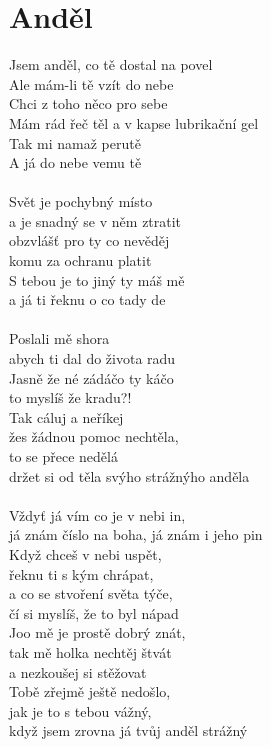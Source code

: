 \section{Anděl}
\begin{multicols}{2}
Jsem anděl, co tě dostal na povel\\
Ale mám-li tě vzít do nebe\\
Chci z toho něco pro sebe\\
Mám rád řeč těl a v kapse lubrikační gel\\
Tak mi namaž perutě\\
A já do nebe vemu tě\\
\\
Svět je pochybný místo\\
a je snadný se v něm ztratit\\
obzvlášť pro ty co nevěděj \\
komu za ochranu platit\\
S tebou je to jiný ty máš mě\\
a já ti řeknu o co tady de\\
\\
Poslali mě shora \\
abych ti dal do života radu\\
Jasně že né zádáčo ty káčo\\
to myslíš že kradu?!\\
Tak cáluj a neříkej \\
žes žádnou pomoc nechtěla,\\
to se přece nedělá\\
držet si od těla svýho strážnýho anděla\\
\\
Vždyť já vím co je v nebi in,\\
já znám číslo na boha, já znám i jeho pin\\
Když chceš v nebi uspět,\\
řeknu ti s kým chrápat, \\
a co se stvoření světa týče,\\
čí si myslíš, že to byl nápad\\
Joo mě je prostě dobrý znát, \\
tak mě holka nechtěj štvát\\
a nezkoušej si stěžovat\\
Tobě zřejmě ještě nedošlo,\\
jak je to s tebou vážný,\\
když jsem zrovna já tvůj anděl strážný\\

\end{multicols}
